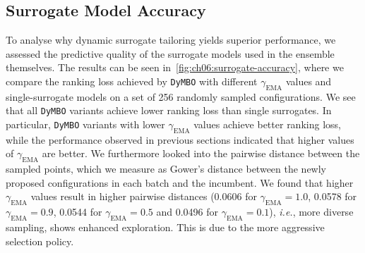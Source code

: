 \subsection{Surrogate Model Accuracy}
\label{sec:ch06:surr-acc}

To analyse why dynamic surrogate tailoring yields superior performance, we assessed the predictive quality of the surrogate models used in the ensemble themselves.
The results can be seen in~\cref{fig:ch06:surrogate-accuracy}, where we compare the ranking loss achieved by \texttt{DyMBO} with different $\gamma_{\mathrm{EMA}}$ values and single-surrogate models on a set of 256 randomly sampled configurations.
We see that all \texttt{DyMBO} variants achieve lower ranking loss than single surrogates.
In particular, \texttt{DyMBO} variants with lower $\gamma_{\mathrm{EMA}}$ values achieve better ranking loss, while the performance observed in previous sections indicated that higher values of $\gamma_{\mathrm{EMA}}$ are better.
We furthermore looked into the pairwise distance between the sampled points, which we measure as Gower's distance between the newly proposed configurations in each batch and the incumbent. We found that higher $\gamma_{\mathrm{EMA}}$ values result in higher pairwise distances (0.0606 for $\gamma_{\mathrm{EMA}}=1.0$, 0.0578 for $\gamma_{\mathrm{EMA}}=0.9$, 0.0544 for $\gamma_{\mathrm{EMA}}=0.5$ and 0.0496 for $\gamma_{\mathrm{EMA}}=0.1$), \emph{i.e.}, more diverse sampling, shows enhanced exploration. This is due to the more aggressive selection policy.


